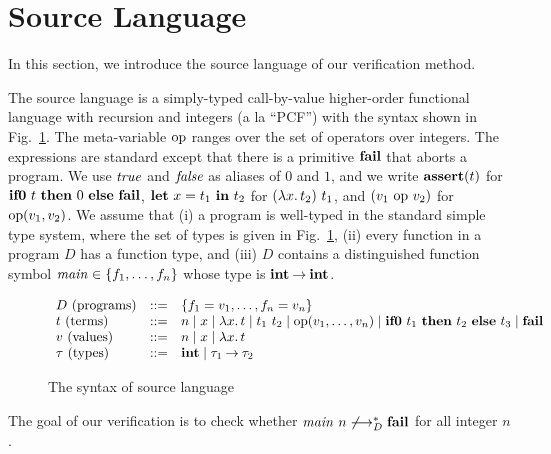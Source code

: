 \section{Source Language}
\label{sec:language}
In this section, we introduce the source language of our verification method.

The source language is a simply-typed call-by-value higher-order
functional language with recursion and integers (a la ``PCF'') with the
syntax shown in Fig.~\ref{fig:source-syntax}.
The meta-variable $\mathrm{op}$ ranges over the set of operators over integers.
The expressions are standard except that there is a primitive $\mathbf{fail}$
that aborts a program.  We use $\mathit{true}$ and $\mathit{false}$ as aliases of $0$
and $1$, and we write $\mathbf{assert}({t})$ for $\mathbf{if0}~{t}~\mathbf{then}~{0}~\mathbf{else}~{\mathbf{fail}}$,
$\mathbf{let}\ {x} = {t_1}\ \mathbf{in}\ {t_2}$ for $(\lambda{x}.\,{t_2})\ t_1$, and $(v_1\ \mathrm{op}\ v_2)$ for $\mathrm{op}({v_1,v_2})$.  We
assume that (i) a program is well-typed in the standard simple type system,
where the set of types is given in Fig.~\ref{fig:source-syntax}, (ii)
every function in a program $D$ has a function type, and (iii) $D$ contains a
distinguished function symbol $\mathit{main} \in \{{f_1,\dots,f_n}\}$ whose type
is ${\mathbf{int}}\mathbin{\rightarrow}{\mathbf{int}}$.

\begin{figure}[t]
\[
\begin{array}{lrl}
D\text{ (programs)} &::=& \{f_1 = v_1, \dots, f_n = v_n\} \\
t\text{ (terms)}
  &::=& n \mid x \mid \lambda{x}.\,{t} \mid t_1\ t_2 \mid \mathrm{op}({v_1,\dots,v_n}) \mid \mathbf{if0}~{t_1}~\mathbf{then}~{t_2}~\mathbf{else}~{t_3} \mid \mathbf{fail} \\
v\text{ (values)} &::=& n \mid x \mid \lambda{x}.\,{t} \\
\tau\text{ (types)} &::=& \mathbf{int} \mid {\tau_1}\mathbin{\rightarrow}{\tau_2} \\
\end{array}
\]
\caption{The syntax of source language}
\label{fig:source-syntax}
\end{figure}

The goal of our verification is to check whether ${\mathit{main}}~{n}
\not\longrightarrow^*_D \mathbf{fail}$ for all integer $n$.

